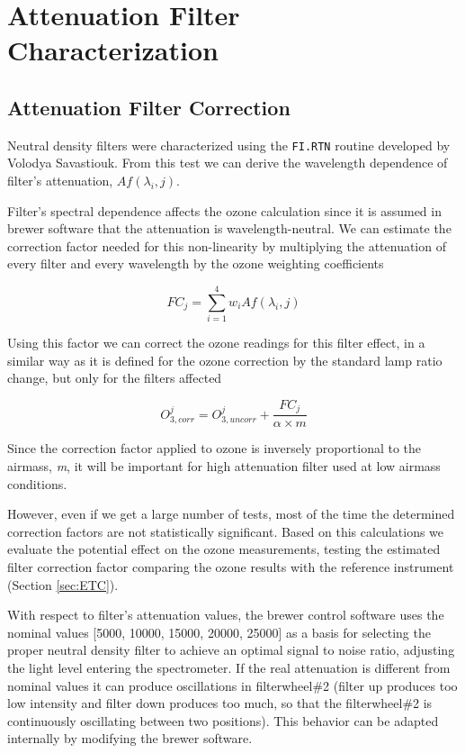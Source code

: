 
\section{Attenuation Filter Characterization} \label{sec:FI}

\subsection{Attenuation Filter Correction} \label{subsec:FIC}
Neutral density filters were characterized using the \texttt{FI.RTN} routine developed by Volodya Savastiouk. From this test we can derive the wavelength dependence of filter's attenuation, $Af({\lambda _i},j)$.

Filter's spectral dependence affects the ozone calculation since it is assumed in brewer software that the attenuation is wavelength-neutral. We can estimate the correction factor needed for this non-linearity by multiplying the attenuation of every filter and every wavelength by the ozone weighting coefficients

\[F{C_j} = \sum\limits_{i = 1}^4 {{w_i}} Af({\lambda _i},j)\]

Using this factor we can correct the ozone readings for this filter effect, in a similar way as it is defined for the ozone correction by the standard lamp ratio change, but only for the filters affected

\[O^{j}_{3,corr} = O^{j}_{3,uncorr} + \frac{FC_j}{\alpha \times m}\]

Since the correction factor applied to ozone is inversely proportional to the airmass, \emph{m}, it will be important for high attenuation filter used at low airmass conditions.

However, even if we get a large number of tests, most of the time the determined correction factors are not statistically significant. Based on this calculations we evaluate the potential effect on the ozone measurements, testing the estimated filter correction factor comparing the ozone results with the reference instrument (Section \ref{sec:ETC}).

With respect to filter's attenuation values, the brewer control software uses the nominal values [5000, 10000, 15000, 20000, 25000] as a basis for selecting the proper neutral density filter to achieve an optimal signal to noise ratio, adjusting the light level entering the spectrometer. If the real attenuation is different from nominal values it can produce oscillations in filterwheel\#2 (filter up produces too low intensity and filter down produces too much, so that the filterwheel\#2 is continuously oscillating between two positions). This behavior can be adapted internally by modifying the brewer software.

